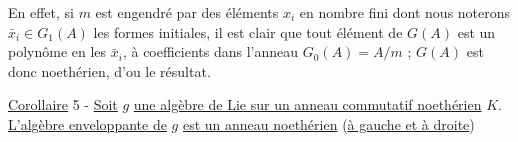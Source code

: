 En effet, si $m$ est engendré par des éléments $x_i$ en nombre fini dont nous noterons $\bar x_i\in G_1(A)$ les formes initiales, il est clair que tout élément de $G(A)$ est un polynôme en les $\bar x_i$, à coefficients dans l'anneau $G_0(A)=A/m$ ; $G(A)$ est donc noethérien, d'ou le résultat.

\uline{Corollaire} 5 - \uline{Soit} $g$ \uline{une algèbre de Lie sur un anneau commutatif noethérien} $K$. \uline{L'algèbre enveloppante de} $g$ \uline{est un anneau noethérien} (\uline{à gauche et à droite})

